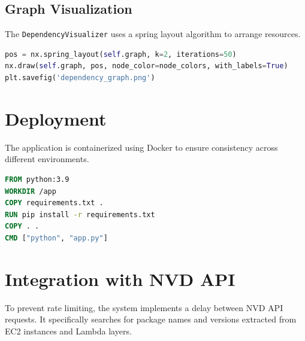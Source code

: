 \subsection{Graph Visualization}
The \texttt{DependencyVisualizer} uses a spring layout algorithm to arrange resources.
\begin{lstlisting}[language=Python, caption=Dependency Graph Generation]
pos = nx.spring_layout(self.graph, k=2, iterations=50)
nx.draw(self.graph, pos, node_color=node_colors, with_labels=True)
plt.savefig('dependency_graph.png')
\end{lstlisting}

\section{Deployment}
The application is containerized using Docker to ensure consistency across different environments.
\begin{lstlisting}[language=Dockerfile, caption=Dockerfile Overview]
FROM python:3.9
WORKDIR /app
COPY requirements.txt .
RUN pip install -r requirements.txt
COPY . .
CMD ["python", "app.py"]
\end{lstlisting}

\section{Integration with NVD API}
To prevent rate limiting, the system implements a delay between NVD API requests. It specifically searches for package names and versions extracted from EC2 instances and Lambda layers.
